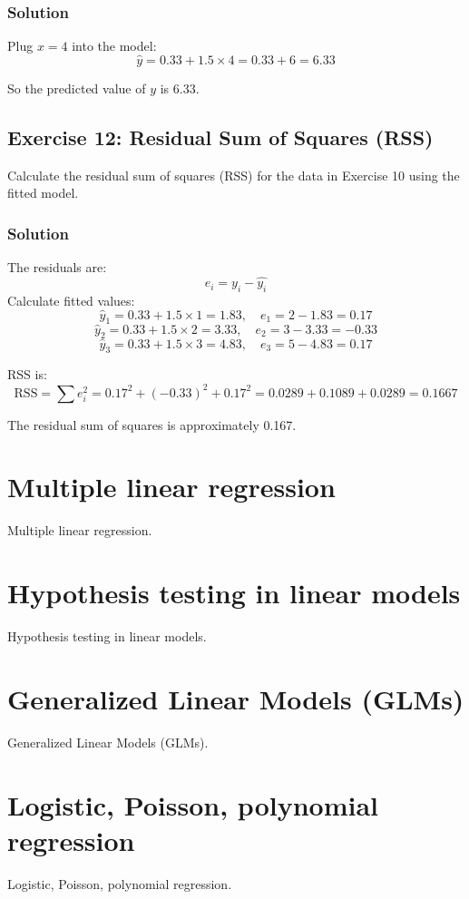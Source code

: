 \documentclass{book}
\begin{document}
\subsubsection*{Solution}
Plug $x=4$ into the model:
\[
\hat{y} = 0.33 + 1.5 \times 4 = 0.33 + 6 = 6.33
\]

So the predicted value of $y$ is 6.33.

\subsection*{Exercise 12: Residual Sum of Squares (RSS)}
Calculate the residual sum of squares (RSS) for the data in Exercise 10 using the fitted model.

\subsubsection*{Solution}
The residuals are:
\[
e_i = y_i - \hat{y_i}
\]
Calculate fitted values:
\[
\hat{y}_1 = 0.33 + 1.5 \times 1 = 1.83, \quad e_1 = 2 - 1.83 = 0.17
\]
\[
\hat{y}_2 = 0.33 + 1.5 \times 2 = 3.33, \quad e_2 = 3 - 3.33 = -0.33
\]
\[
\hat{y}_3 = 0.33 + 1.5 \times 3 = 4.83, \quad e_3 = 5 - 4.83 = 0.17
\]

RSS is:
\[
\text{RSS} = \sum e_i^2 = 0.17^2 + (-0.33)^2 + 0.17^2 = 0.0289 + 0.1089 + 0.0289 = 0.1667
\]

The residual sum of squares is approximately 0.167.

\newpage

\section{Multiple linear regression}
Multiple linear regression.

\newpage

\section{Hypothesis testing in linear models}
Hypothesis testing in linear models.

\newpage

\section{Generalized Linear Models (GLMs)}
Generalized Linear Models (GLMs).

\newpage

\section{Logistic, Poisson, polynomial regression}
Logistic, Poisson, polynomial regression.
\end{document}
